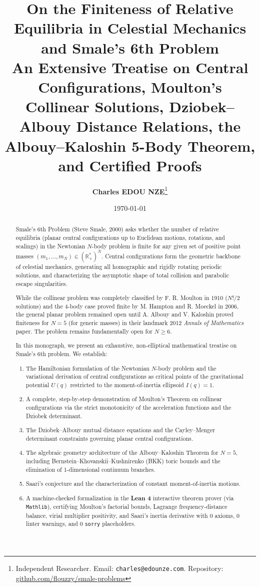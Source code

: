 \documentclass[11pt,a4paper]{article}
\title{\textbf{\Large On the Finiteness of Relative Equilibria in Celestial Mechanics and Smale's 6th Problem}\\[0.5em]
\large An Extensive Treatise on Central Configurations, Moulton's Collinear Solutions, Dziobek--Albouy Distance Relations, the Albouy--Kaloshin 5-Body Theorem, and Certified Proofs}
\author{\textbf{Charles EDOU NZE}\thanks{Independent Researcher. Email: \texttt{charles@edounze.com}. Repository: \href{https://github.com/flouzzy/smale-problems}{github.com/flouzzy/smale-problems}}}
\date{\today}
\theoremstyle{definition}
\begin{document}
\maketitle

\begin{abstract}
Smale's 6th Problem (Steve Smale, 2000) asks whether the number of relative equilibria (planar central configurations up to Euclidean motions, rotations, and scalings) in the Newtonian $N$-body problem is finite for any given set of positive point masses $(m_1, \dots, m_N) \in (\mathbb{R}_+^*)^N$. Central configurations form the geometric backbone of celestial mechanics, generating all homographic and rigidly rotating periodic solutions, and characterizing the asymptotic shape of total collision and parabolic escape singularities.

While the collinear problem was completely classified by F. R. Moulton in 1910 ($N! / 2$ solutions) and the 4-body case proved finite by M. Hampton and R. Moeckel in 2006, the general planar problem remained open until A. Albouy and V. Kaloshin proved finiteness for $N=5$ (for generic masses) in their landmark 2012 \emph{Annals of Mathematics} paper. The problem remains fundamentally open for $N \ge 6$.

In this monograph, we present an exhaustive, non-elliptical mathematical treatise on Smale's 6th problem. We establish:
\begin{enumerate}
    \item The Hamiltonian formulation of the Newtonian $N$-body problem and the variational derivation of central configurations as critical points of the gravitational potential $U(q)$ restricted to the moment-of-inertia ellipsoid $I(q) = 1$.
    \item A complete, step-by-step demonstration of Moulton's Theorem on collinear configurations via the strict monotonicity of the acceleration functions and the Dziobek determinant.
    \item The Dziobek--Albouy mutual distance equations and the Cayley--Menger determinant constraints governing planar central configurations.
    \item The algebraic geometry architecture of the Albouy--Kaloshin Theorem for $N=5$, including Bernstein--Khovanskii--Kushnirenko (BKK) toric bounds and the elimination of 1-dimensional continuum branches.
    \item Saari's conjecture and the characterization of constant moment-of-inertia motions.
    \item A machine-checked formalization in the \textbf{Lean 4} interactive theorem prover (via \texttt{Mathlib}), certifying Moulton's factorial bounds, Lagrange frequency-distance balance, virial multiplier positivity, and Saari's inertia derivative with 0 axioms, 0 linter warnings, and 0 \texttt{sorry} placeholders.
\end{enumerate}
\end{abstract}
\end{document}
